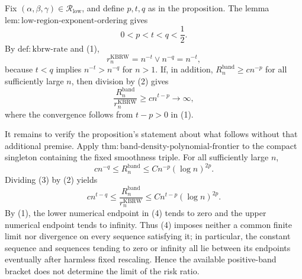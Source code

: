 Fix \((\alpha,\beta,\gamma)\in\mathcal R_{\mathrm{low}}\), and define
\(p,t,q\) as in the proposition.  The lemma
\(\mathrm{lem:low\mbox{-}region\mbox{-}exponent\mbox{-}ordering}\) gives
\[
0<p<t<q<\frac12.
\tag{1}
\]
By \(\mathrm{def:kbrw\mbox{-}rate}\) and (1),
\[
r_n^{\mathrm{KBRW}}
=n^{-t}\vee n^{-q}
=n^{-t},
\tag{2}
\]
because \(t<q\) implies \(n^{-t}>n^{-q}\) for \(n>1\).  If, in addition,
\(R_n^{\mathrm{band}}\geq c n^{-p}\) for all sufficiently large \(n\),
then division by (2) gives
\[
\frac{R_n^{\mathrm{band}}}{r_n^{\mathrm{KBRW}}}
\geq c n^{t-p}\longrightarrow\infty,
\]
where the convergence follows from \(t-p>0\) in (1).

It remains to verify the proposition's statement about what follows without
that additional premise.  Apply
\(\mathrm{thm:band\mbox{-}density\mbox{-}polynomial\mbox{-}frontier}\) to
the compact singleton containing the fixed smoothness triple.  For all
sufficiently large \(n\),
\[
c n^{-q}\leq R_n^{\mathrm{band}}
\leq Cn^{-p}(\log n)^{2p}.
\tag{3}
\]
Dividing (3) by (2) yields
\[
c n^{t-q}\leq
\frac{R_n^{\mathrm{band}}}{r_n^{\mathrm{KBRW}}}
\leq Cn^{t-p}(\log n)^{2p}.
\tag{4}
\]
By (1), the lower numerical endpoint in (4) tends to zero and the upper
numerical endpoint tends to infinity.  Thus (4) imposes neither a common
finite limit nor divergence on every sequence satisfying it; in particular,
the constant sequence and sequences tending to zero or infinity all lie
between its endpoints eventually after harmless fixed rescaling.  Hence the
available positive-band bracket does not determine the limit of the risk
ratio.